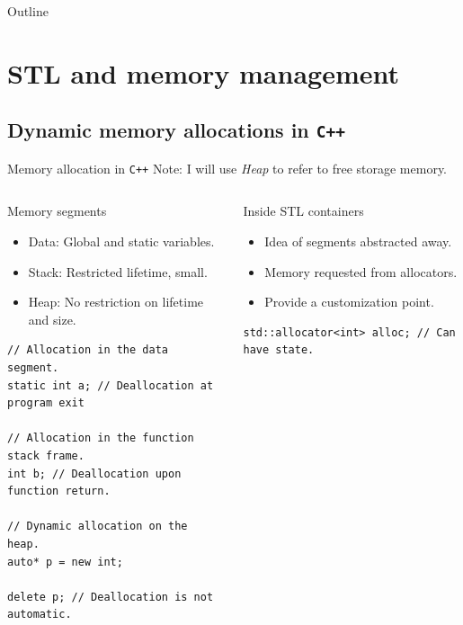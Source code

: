 \documentclass[10pt,aspectratio=169]{beamer}
\begin{document}
\begin{frame}{Outline}
   \tableofcontents
\end{frame}

\section{STL and memory management}

\subsection{Dynamic memory allocations in \texttt{C++}}

\begin{frame}[fragile]{Memory allocation in \texttt{C++}}
{Note: I will use {\it Heap} to refer to free storage memory.}
\begin{columns}
\begin{column}[t]{0.45\textwidth}
\begin{block}{Memory segments}
\begin{itemize}
\item Data: Global and static variables.
\item Stack: Restricted lifetime, small.
\item Heap: No restriction on lifetime and size.
\end{itemize}
\end{block}
\begin{lstlisting}
// Allocation in the data segment.
static int a; // Deallocation at program exit

// Allocation in the function stack frame.
int b; // Deallocation upon function return.

// Dynamic allocation on the heap.
auto* p = new int;

delete p; // Deallocation is not automatic.
\end{lstlisting}
\end{column}

\begin{column}[t]{0.45\textwidth}
\begin{block}{Inside STL containers}
\begin{itemize}
\item Idea of segments abstracted away.
\item Memory requested from allocators.
\item Provide a customization point.
\end{itemize}
\end{block}
\begin{lstlisting}
std::allocator<int> alloc; // Can have state.


\end{lstlisting}
\end{column}
\end{columns}
\end{frame}
\end{document}

